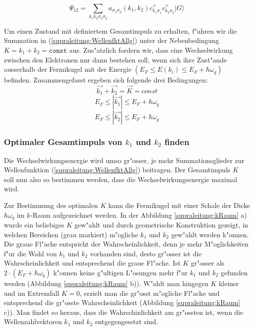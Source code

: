 \begin{refsection}
\begin{equation}
\Psi_{12}=\sum \limits_{k_1k_2\sigma_1\sigma_2} a_{\sigma_1\sigma_2}
(k_1,k_2)c^+_{k_1\sigma_1}c^+_{k_2\sigma_2}|G\rangle
\label{supraleitung:WellenfktAllg}
\end{equation}

Um einen Zustand mit definiertem Gesamtimpuls zu erhalten, f"uhren wir die Summation in
(\ref{supraleitung:WellenfktAllg}) unter der Nebenbedingung $K=k_1+k_2=\texttt{const}$ aus.
Zus"atzlich fordern wir, dass eine Wechselwirkung zwischen den Elektronen nur dann bestehen soll,
wenn sich ihre Zust"ande ausserhalb der Fermikugel mit der Energie
$(E_F \le E(k_i) \le E_F+\hbar\omega_q)$ befinden.
Zusammengefasst ergeben sich folgende drei Bedingungen:
\[
\overrightarrow{k_1}+\overrightarrow{k_2}=\overrightarrow{K}=const
\]
\[
E_F\le|\overrightarrow{k_1}|\le E_F+\hbar\omega_q
\]
\[
E_F\le|\overrightarrow{k_2}|\le E_F+\hbar\omega_q
\]
\subsubsection{Optimaler Gesamtimpuls von $k_1$ und $k_2$ finden}

Die Wechselwirkungsenergie wird umso gr"osser, je mehr Summationsglieder zur Wellenfunktion
(\ref{supraleitung:WellenfktAllg}) beitragen.
Der Gesamtimpuls $K$ soll nun also so bestimmen werden, dass die Wechselwirkungsenergie maximal wird.

Zur Bestimmung des optimalen $K$ kann die Fermikugel mit einer Schale der Dicke
$\hbar\omega_q$ im $k$-Raum aufgezeichnet werden.
In der Abbildung \ref{supraleitung:kRaum} a) wurde ein beliebiges $K$ gew"ahlt und durch
geometrische Konstruktion gezeigt, in welchen Bereichen (grau markiert) m"ogliche $k_1$ und $k_2$
gew"ahlt werden k"onnen.
Die graue Fl"ache entspricht der Wahrscheinlichkeit, denn je mehr M"oglichkeiten f"ur die Wahl
von $k_1$ und $k_2$ vorhanden sind, desto gr"osser ist die Wahrscheinlichkeit und entsprechend
die graue Fl"ache.
Ist $K$ gr"osser als $2\cdot(E_F+\hbar\omega_q)$ k"onnen keine g"ultigen L"osungen mehr
f"ur $k_1$ und $k_2$ gefunden werden (Abbildung \ref{supraleitung:kRaum} b)).
W"ahlt man hingegen $K$ kleiner und im Extremfall $K=0$, erzielt man die gr"osst m"ogliche
Fl"ache und entsprechend die gr"osste Wahrscheinlichkeit (Abbildung \ref{supraleitung:kRaum} c)).
Man findet so heraus, dass die Wahrschinlichkeit am gr"ossten ist, wenn die
Wellenzahlvektoren $k_1$ und $k_2$ entgegengesetzt sind.


\end{refsection}
